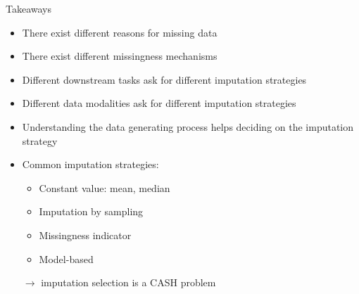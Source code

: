 \documentclass[11pt,compress,t,notes=noshow, aspectratio=169, xcolor=table]{beamer}
\begin{document}
\begin{frame}{Takeaways}
    \vfill
    \begin{itemize}
        \item There exist different reasons for missing data
        \item There exist different missingness mechanisms
        \item Different downstream tasks ask for different imputation strategies
        \item Different data modalities ask for different imputation strategies
        \item Understanding the data generating process helps deciding on the imputation strategy
        \item Common imputation strategies:
        \begin{itemize}
            \item Constant value: mean, median
            \item Imputation by sampling
            \item Missingness indicator
            \item Model-based
        \end{itemize}
        $\rightarrow$ imputation selection is a CASH problem
    \end{itemize}
    \vfill
\end{frame}

\endlecture
\end{document}
